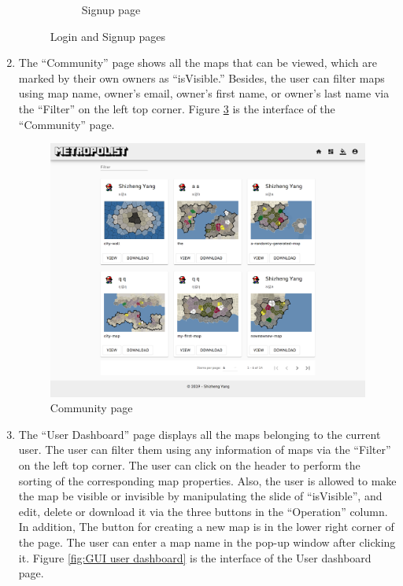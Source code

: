 \begin{enumerate}
\begin{figure}
\begin{subfigure}{.5\textwidth}
      \caption{Signup page}
      \label{fig:GUI signup}
    \end{subfigure}
    \caption{Login and Signup pages}
    \label{fig:Login and Signup pages}
  \end{figure}

  \item The ``Community'' page shows all the maps that can be viewed, which are marked by their own owners as ``isVisible.'' Besides, the user can filter maps using map name, owner's email, owner's first name, or owner's last name via the ``Filter'' on the left top corner. Figure \ref{fig:GUI community} is the interface of the ``Community'' page.

  \begin{figure}[htbp]
    \centering
    \includegraphics[width=\textwidth]{section04/assets/GUI-community.png}
    \caption{Community page}
    \label{fig:GUI community}
  \end{figure}

  \item The ``User Dashboard'' page displays all the maps belonging to the current user. The user can filter them using any information of maps via the ``Filter'' on the left top corner. The user can click on the header to perform the sorting of the corresponding map properties. Also, the user is allowed to make the map be visible or invisible by manipulating the slide of ``isVisible'', and edit, delete or download it via the three buttons in the ``Operation'' column. In addition, The button for creating a new map is in the lower right corner of the page. The user can enter a map name in the pop-up window after clicking it. Figure \ref{fig:GUI user dashboard} is the interface of the User dashboard page.


\end{enumerate}
